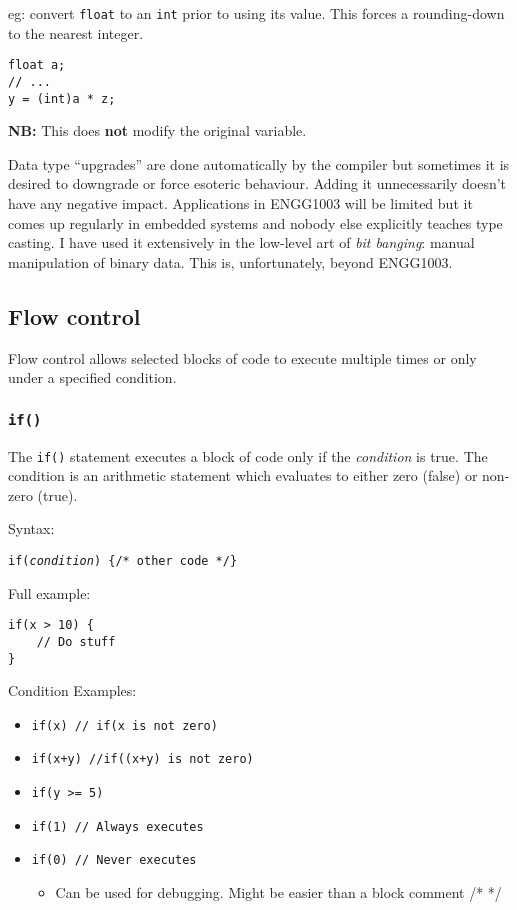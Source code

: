 \documentclass{lab}
\begin{document}
\begin{multicols}{2}
eg: convert \texttt{float} to an \texttt{int} prior to using its value. This forces a rounding-down to the nearest integer.

\begin{lstlisting}[style=CStyle]
float a;
// ...
y = (int)a * z;
\end{lstlisting}

\textbf{NB:} This does \textbf{not} modify the original variable.

Data type ``upgrades'' are done automatically by the compiler but sometimes it is desired to downgrade or force esoteric behaviour. Adding it unnecessarily doesn't have any negative impact. Applications in ENGG1003 will be limited but it comes up regularly in embedded systems and nobody else explicitly teaches type casting. I have used it extensively in the low-level art of \textit{bit banging}: manual manipulation of binary data. This is, unfortunately, beyond ENGG1003.

\subsection{Flow control}

Flow control allows selected blocks of code to execute multiple times or only under a specified condition.

\subsubsection{\texttt{if()}}

The \texttt{if()} statement executes a block of code only if the \textit{condition} is true. The condition is an arithmetic statement which evaluates to either zero (false) or non-zero (true).
\columnbreak

Syntax:

\texttt{if(\textit{condition}) \{/* other code */\}}

Full example:

\begin{lstlisting}[style=CStyle]
if(x > 10) {
	// Do stuff
}
\end{lstlisting}

Condition Examples:
\begin{itemize}
\item \texttt{if(x) // if(x is not zero)}
\item \texttt{if(x+y) //if((x+y) is not zero)}
\item \texttt{if(y >= 5)}
\item \texttt{if(1) // Always executes}
\item \texttt{if(0) // Never executes}
	\begin{itemize}
		\item Can be used for debugging. Might be easier than a block comment /* */
	\end{itemize}
\end{itemize}


\end{multicols}
\end{document}
